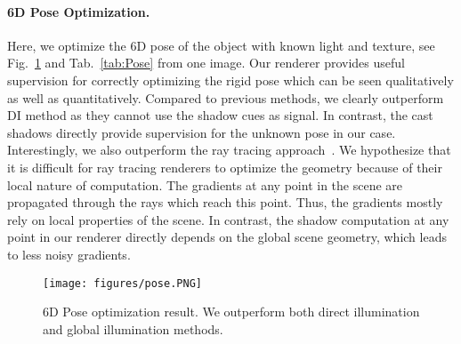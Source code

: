 \paragraph{6D Pose Optimization.}
%
Here, we optimize the 6D pose of the object with known light and texture, see Fig.~\ref{fig:Pose} and Tab.~\ref{tab:Pose} from one image.
%
Our renderer provides useful supervision for correctly optimizing the rigid pose which can be seen qualitatively as well as quantitatively.
%
Compared to previous methods, we clearly outperform DI method as they cannot use the shadow cues as signal.
%
In contrast, the cast shadows directly provide supervision for the unknown pose in our case.
%
Interestingly, we also outperform the ray tracing approach~\cite{li2018differentiable}.
%
We hypothesize that it is difficult for ray tracing renderers to optimize the geometry because of their local nature of computation. 
%
The gradients at any point in the scene are propagated through the rays which reach this point.
%
Thus, the gradients mostly rely on local properties of the scene. 
%
In contrast, the shadow computation at any point in our renderer directly depends on the global scene geometry, which leads to less noisy gradients. 
%
%
\begin{figure}
	\texttt{[image: figures/pose.PNG]} 
	\caption
	{
		6D Pose optimization result. 
		We outperform both direct illumination and global illumination methods.
	}
	\label{fig:Pose}
\end{figure}
%
%
%
